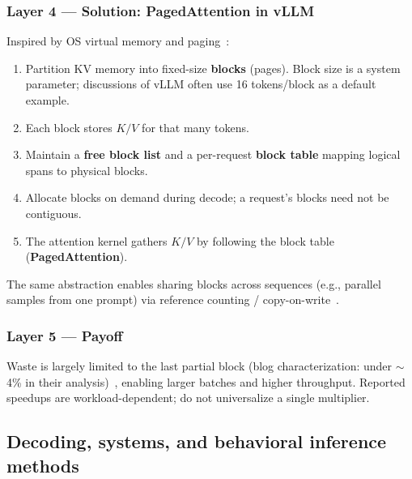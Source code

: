 \documentclass[11pt,a4paper]{article}
\begin{document}
\subsubsection*{Layer 4 --- Solution: PagedAttention in vLLM}
Inspired by OS virtual memory and paging~\cite{kwon2023vllm,vllmblog2023}:
\begin{enumerate}[leftmargin=*]
  \item Partition KV memory into fixed-size \textbf{blocks} (pages). Block size is a system parameter; discussions of vLLM often use 16 tokens/block as a default example.
  \item Each block stores \(K/V\) for that many tokens.
  \item Maintain a \textbf{free block list} and a per-request \textbf{block table} mapping logical spans to physical blocks.
  \item Allocate blocks on demand during decode; a request's blocks need not be contiguous.
  \item The attention kernel gathers \(K/V\) by following the block table (\textbf{PagedAttention}).
\end{enumerate}
The same abstraction enables sharing blocks across sequences (e.g., parallel samples from one prompt) via reference counting / copy-on-write~\cite{vllmblog2023}.

\subsubsection*{Layer 5 --- Payoff}
Waste is largely limited to the last partial block (blog characterization: under \(\sim\)4\% in their analysis)~\cite{vllmblog2023}, enabling larger batches and higher throughput.
Reported speedups are workload-dependent; do not universalize a single multiplier.

\subsection{Decoding, systems, and behavioral inference methods}
\label{sec:decode-behave}
\end{document}
